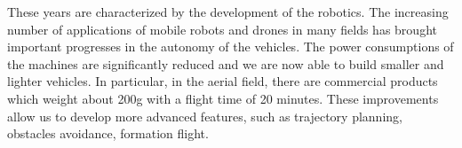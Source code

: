 


These years are characterized by the development of the robotics.
The increasing number of applications of mobile robots and drones in many fields
has brought important progresses in the autonomy of the vehicles.
The power consumptions of the machines are significantly reduced and we are now
able to build smaller and lighter vehicles. In particular, in the aerial field,
there are commercial products which weight about 200g with a flight time of 20
minutes. These improvements allow us to develop more advanced features, such as
trajectory planning, obstacles avoidance, formation flight.
  
